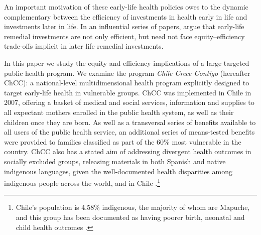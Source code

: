 \documentclass[12pt]{article}
\begin{document}
\begin{spacing}{1.4}
An important motivation of these early-life health policies owes
to the dynamic complementary between the efficiency of investments in health
early in life and investments later in life.  In an influential series of
papers, \citet{HeckmanCunha2007,CunhaHeckman2009,Cunhaetal2010} argue that
early-life remedial investments are not only efficient, but need not face
equity--efficiency trade-offs implicit in later life remedial investments.

In this paper we study the equity and efficiency implications of a large
targeted public health program.  We examine the program \emph{Chile Crece
  Contigo} (hereafter ChCC): a national-level multidimensional health
program explicitly designed to target early-life health in vulnerable
groups.  ChCC was implemented in Chile in 2007, offering a basket of medical
and social services, information and supplies to all expectant mothers
enrolled in the public health system, as well as their children once they
are born.  As well as a transversal series of benefits available to all
users of the public health service, an additional series of means-tested
benefits were provided to families classified as part of the 60\% most
vulnerable in the country.  ChCC also has a stated
aim of addressing divergent health outcomes in socially excluded groups,
releasing materials in both Spanish and native indigenous languages, given
the well-documented health disparities among indigenous people across the
world, and in Chile \citep{Andersonetal2016}.\footnote{Chile's population
  is 4.58\% indigenous, the majority of whom are Mapuche, and this group
  has been documented as having poorer birth, neonatal and child health
  outcomes \citep{Andersonetal2016}.}%


\end{spacing}
\end{document}
